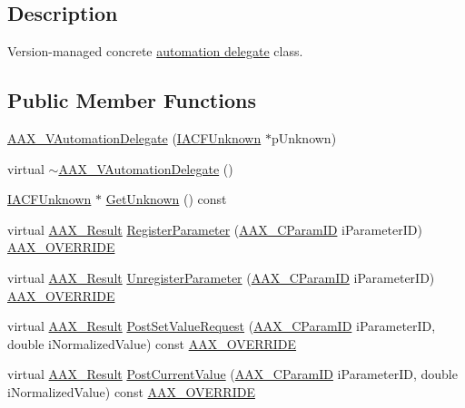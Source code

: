 \subsection{Description}
Version-\/managed concrete \hyperlink{a00086}{automation delegate} class. \subsection*{Public Member Functions}
\begin{DoxyCompactItemize}
\item 
\hyperlink{a00129_a4390446f2d57916419490f46b6978826}{A\+A\+X\+\_\+\+V\+Automation\+Delegate} (\hyperlink{a00146}{I\+A\+C\+F\+Unknown} $\ast$p\+Unknown)
\item 
virtual \hyperlink{a00129_abf28c02f80da98d4de73e1c41e28a56f}{$\sim$\+A\+A\+X\+\_\+\+V\+Automation\+Delegate} ()
\item 
\hyperlink{a00146}{I\+A\+C\+F\+Unknown} $\ast$ \hyperlink{a00129_a9239880d9b8e3455bec1295d42bc73d6}{Get\+Unknown} () const 
\item 
virtual \hyperlink{a00149_a4d8f69a697df7f70c3a8e9b8ee130d2f}{A\+A\+X\+\_\+\+Result} \hyperlink{a00129_a481c2d77108aa152748ea078af53c43a}{Register\+Parameter} (\hyperlink{a00149_a1440c756fe5cb158b78193b2fc1780d1}{A\+A\+X\+\_\+\+C\+Param\+I\+D} i\+Parameter\+I\+D) \hyperlink{a00149_ac2f24a5172689ae684344abdcce55463}{A\+A\+X\+\_\+\+O\+V\+E\+R\+R\+I\+D\+E}
\item 
virtual \hyperlink{a00149_a4d8f69a697df7f70c3a8e9b8ee130d2f}{A\+A\+X\+\_\+\+Result} \hyperlink{a00129_ac7010174ac7922ee29c656ce9bd80453}{Unregister\+Parameter} (\hyperlink{a00149_a1440c756fe5cb158b78193b2fc1780d1}{A\+A\+X\+\_\+\+C\+Param\+I\+D} i\+Parameter\+I\+D) \hyperlink{a00149_ac2f24a5172689ae684344abdcce55463}{A\+A\+X\+\_\+\+O\+V\+E\+R\+R\+I\+D\+E}
\item 
virtual \hyperlink{a00149_a4d8f69a697df7f70c3a8e9b8ee130d2f}{A\+A\+X\+\_\+\+Result} \hyperlink{a00129_a7a39ceb91c5326bda65ad01a001aa688}{Post\+Set\+Value\+Request} (\hyperlink{a00149_a1440c756fe5cb158b78193b2fc1780d1}{A\+A\+X\+\_\+\+C\+Param\+I\+D} i\+Parameter\+I\+D, double i\+Normalized\+Value) const \hyperlink{a00149_ac2f24a5172689ae684344abdcce55463}{A\+A\+X\+\_\+\+O\+V\+E\+R\+R\+I\+D\+E}
\item 
virtual \hyperlink{a00149_a4d8f69a697df7f70c3a8e9b8ee130d2f}{A\+A\+X\+\_\+\+Result} \hyperlink{a00129_a341b964fc84feba0a801928dbba4f545}{Post\+Current\+Value} (\hyperlink{a00149_a1440c756fe5cb158b78193b2fc1780d1}{A\+A\+X\+\_\+\+C\+Param\+I\+D} i\+Parameter\+I\+D, double i\+Normalized\+Value) const \hyperlink{a00149_ac2f24a5172689ae684344abdcce55463}{A\+A\+X\+\_\+\+O\+V\+E\+R\+R\+I\+D\+E}

\end{DoxyCompactItemize}
